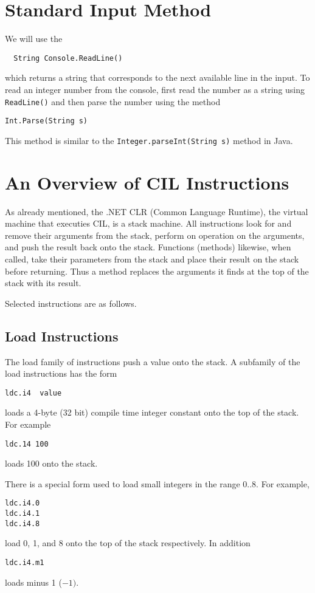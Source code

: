 \documentclass[10pt,a4paper]{amsart}
\begin{document}
\section{Standard Input Method}

We will use the 
\begin{verbatim}
  String Console.ReadLine()
\end{verbatim}  
which returns a string that corresponds to the next available line in the input.
To read an integer number from the console, first read the number as a string using {\tt ReadLine()} and
then parse the number using the method

\begin{verbatim}
Int.Parse(String s)
\end{verbatim}

This method is similar to the {\tt Integer.parseInt(String s)} method in Java.

\section{An Overview of CIL Instructions}

As already mentioned, the .NET  CLR (Common Language Runtime), the virtual machine that executies CIL,
is a stack machine. All instructions look for and remove their arguments from the stack, perform on operation
on the arguments, and push the result back onto the stack. Functions (methods) likewise, when called, take their
parameters from the stack and place their result on the stack before returning. Thus a method replaces the arguments 
it finds at the top of the stack with its result.

Selected instructions are as follows. 
\subsection{Load Instructions}

The load family of instructions push a value onto the stack. A subfamily of the load instructions has the 
form  
\begin{verbatim}
ldc.i4  value
\end{verbatim}
loads a 4-byte (32 bit) compile time integer constant onto the top of the stack. For example 
\begin{verbatim}
ldc.14 100
\end{verbatim}
loads 100 onto the stack.

There is a special form used to load small integers in the range 0..8. For example, 
\begin{verbatim}
ldc.i4.0
ldc.i4.1
ldc.i4.8
\end{verbatim}
load 0, 1, and 8 onto the top of the stack respectively.  In addition
\begin{verbatim}
ldc.i4.m1
\end{verbatim} 
loads minus 1 ($-1)$.
\end{document}
